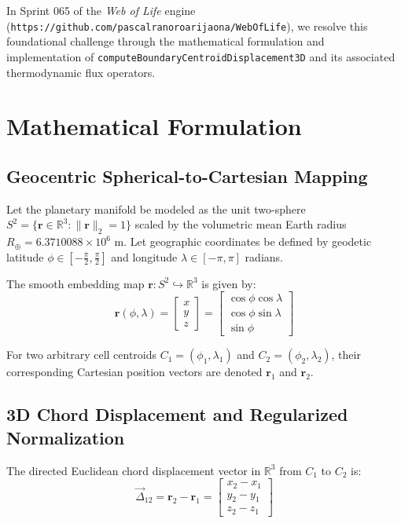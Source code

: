 \documentclass[11pt,a4paper]{article}
\theoremstyle{definition}
\begin{document}
In Sprint 065 of the \textit{Web of Life} engine (\texttt{https://github.com/pascalranoroarijaona/WebOfLife}), we resolve this foundational challenge through the mathematical formulation and implementation of \texttt{computeBoundaryCentroidDisplacement3D} and its associated thermodynamic flux operators.

\section{Mathematical Formulation}

\subsection{Geocentric Spherical-to-Cartesian Mapping}

Let the planetary manifold be modeled as the unit two-sphere $S^2 = \{ \mathbf{r} \in \mathbb{R}^3 : \|\mathbf{r}\|_2 = 1 \}$ scaled by the volumetric mean Earth radius $R_{\oplus} = 6.3710088 \times 10^6 \text{ m}$. Let geographic coordinates be defined by geodetic latitude $\phi \in [-\frac{\pi}{2}, \frac{\pi}{2}]$ and longitude $\lambda \in [-\pi, \pi]$ radians.

The smooth embedding map $\mathbf{r}: S^2 \hookrightarrow \mathbb{R}^3$ is given by:
\begin{equation}
\mathbf{r}(\phi, \lambda) = 
\begin{bmatrix}
x \\ y \\ z
\end{bmatrix} =
\begin{bmatrix}
\cos\phi \cos\lambda \\
\cos\phi \sin\lambda \\
\sin\phi
\end{bmatrix}
\label{eq:cartesian_map}
\end{equation}

For two arbitrary cell centroids $C_1 = (\phi_1, \lambda_1)$ and $C_2 = (\phi_2, \lambda_2)$, their corresponding Cartesian position vectors are denoted $\mathbf{r}_1$ and $\mathbf{r}_2$.

\subsection{3D Chord Displacement and Regularized Normalization}

The directed Euclidean chord displacement vector in $\mathbb{R}^3$ from $C_1$ to $C_2$ is:
\begin{equation}
\vec{\Delta}_{12} = \mathbf{r}_2 - \mathbf{r}_1 = 
\begin{bmatrix}
x_2 - x_1 \\
y_2 - y_1 \\
z_2 - z_1
\end{bmatrix}
\end{equation}
\end{document}
